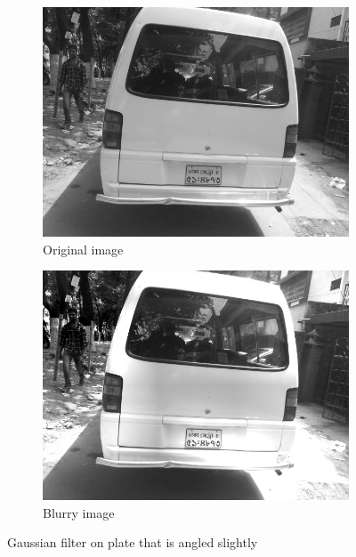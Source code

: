 \begin{figure}
\begin{subfigure}{0.5\textwidth}
    \centering
    \includegraphics[width=0.9\linewidth]{./img/experiment/stage.2/angle}
    \caption{Original image}
\end{subfigure}
\begin{subfigure}{0.5\textwidth}
    \centering
    \includegraphics[width=0.9\linewidth]{./img/experiment/stage.5/angle}
    \caption{Blurry image}
\end{subfigure}
\caption{Gaussian filter on plate that is angled slightly}
\label{fig:EnhanceResult4}
\end{figure}
